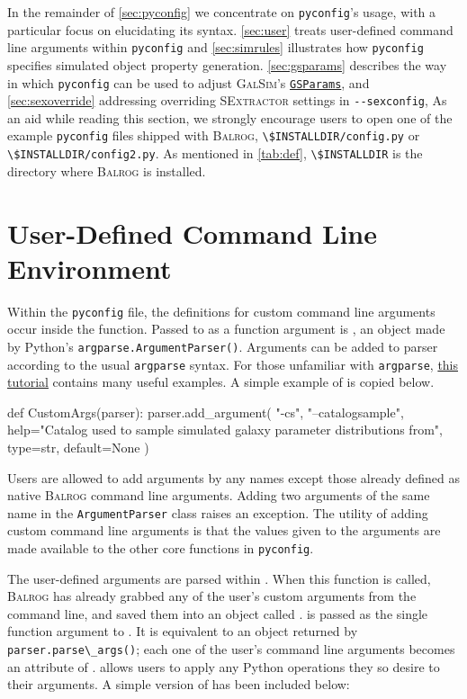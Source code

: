 \documentclass[11pt]{book}
\newcommand{\codett}[1]{\lstinline{#1}}
\newcommand{\py}{Python}
\newcommand{\pyconfig}{\codett{pyconfig}}
\newcommand{\galsim}{\textsc{GalSim}}
\newcommand{\balrog}{\textsc{Balrog}}
\newcommand{\sex}{\textsc{SExtractor}}
\newcommand{\opt}[1]{\codett{--#1}}
\begin{document}
In the remainder of \autoref{sec:pyconfig} we concentrate on \pyconfig{}'s usage, with a particular focus on elucidating its syntax.
\autoref{sec:user} treats user-defined command line arguments within \pyconfig{} and 
\autoref{sec:simrules} illustrates how \pyconfig{} specifies simulated object property generation.
\autoref{sec:gsparams} describes the way in which \pyconfig{} can be used to 
adjust \galsim{}'s \href{http://galsim-developers.github.io/GalSim/structgalsim\_1\_1\_g\_s\_params.html}{\texttt{GSParams}},
and \autoref{sec:sexoverride} addressing overriding \sex{} settings in \opt{sexconfig},
As an aid while reading this section, 
we strongly encourage users to open one of the example \pyconfig{} files shipped with \balrog{},
\codett{\$INSTALLDIR/config.py} or \codett{\$INSTALLDIR/config2.py}.
As mentioned in \autoref{tab:def}, \codett{\$INSTALLDIR} is the directory where \balrog{} is installed.

\section{User-Defined Command Line Environment}
\label{sec:user}

Within the \pyconfig{} file, the definitions for custom command line arguments occur inside the \argsfunc{} function.
Passed to \argsfunc{}  as a function argument is \argsparser{},
an object made by \py{}'s
\codett{argparse.ArgumentParser()}. Arguments
can be added to parser according to the usual
\codett{argparse} syntax.
For those unfamiliar with \codett{argparse},
\href{http://docs.python.org/2/howto/argparse.html}{this tutorial}
contains many useful examples. A simple example of
\argsfunc{} is copied below.

\begin{code}
def CustomArgs(parser):
    parser.add_argument( "-cs", "--catalogsample", help="Catalog used to sample simulated galaxy parameter distributions from", type=str, default=None )
\end{code}

\noindent Users are allowed to add arguments by any names except those already defined as native \balrog{} command line arguments.
Adding two arguments of the same name in the \codett{ArgumentParser} class raises an exception.
The utility of adding custom command line arguments is that the values given to the arguments
are made available to the other core functions in \pyconfig{}.

The user-defined arguments are parsed within \parsefunc{}.
When this function is called, 
\balrog{} has already grabbed any of the user's custom arguments from the command line,
and saved them into an object called \parseargs{}.
\parseargs{} is passed as the single function argument to \parsefunc{}.
It is equivalent to an object returned by \codett{parser.parse\_args()};
each one of the user's command line arguments becomes an attribute of \parseargs{}. 
\parsefunc{} allows users to apply any \py{} operations they so desire to their arguments.
A simple version of \parsefunc{} has been included below:
\end{document}
